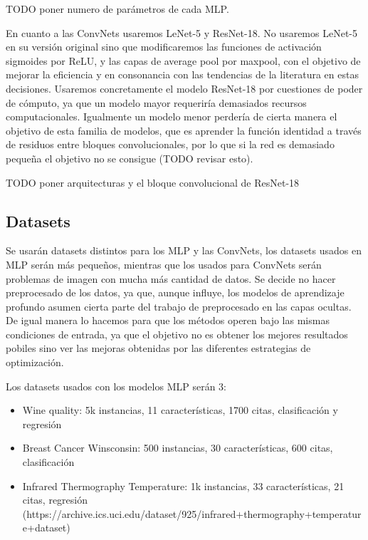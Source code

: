 TODO poner numero de parámetros de cada MLP.

En cuanto a las ConvNets usaremos LeNet-5 y ResNet-18. No usaremos LeNet-5 en su versión original sino que modificaremos las funciones de activación sigmoides por ReLU, y las capas de average pool por maxpool, con el objetivo de mejorar la eficiencia y en consonancia con las tendencias de la literatura en estas decisiones. Usaremos concretamente el modelo ResNet-18 por cuestiones de poder de cómputo, ya que un modelo mayor requeriría demasiados recursos computacionales. Igualmente un modelo menor perdería de cierta manera el objetivo de esta familia de modelos, que es aprender la función identidad a través de residuos entre bloques convolucionales, por lo que si la red es demasiado pequeña el objetivo no se consigue (TODO revisar esto).

TODO poner arquitecturas y el bloque convolucional de ResNet-18


\subsection{Datasets}

Se usarán datasets distintos para los MLP y las ConvNets, los datasets usados en MLP serán más pequeños, mientras que los usados para ConvNets serán problemas de imagen con mucha más cantidad de datos. Se decide no hacer preprocesado de los datos, ya que, aunque influye, los modelos de aprendizaje profundo asumen cierta parte del trabajo de preprocesado en las capas ocultas. De igual manera lo hacemos para que los métodos operen bajo las mismas condiciones de entrada, ya que el objetivo no es obtener los mejores resultados pobiles sino ver las mejoras obtenidas por las diferentes estrategias de optimización.  


Los datasets usados con los modelos MLP serán 3:

\begin{itemize}
    \item Wine quality: 5k instancias, 11 características, 1700 citas, clasificación y regresión
    \item Breast Cancer Winsconsin: 500 instancias, 30 características, 600 citas, clasificación
    \item Infrared Thermography Temperature: 1k instancias, 33 características, 21 citas, regresión (https://archive.ics.uci.edu/dataset/925/infrared+thermography+temperature+dataset)
\end{itemize}

